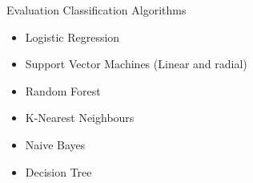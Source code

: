 \documentclass[
 size=14pt,
 paper=smartboard,  %
 mode=present, 		%
 display=slides, 	%
 style=tuliplab,  	%
 pauseslide,
 fleqn,leqno]{powerdot}
\begin{document}
\begin{slide}[toc=,bm=]{Evaluation Classification Algorithms}

\begin{center}
\begin{itemize}
\item
Logistic Regression
\item
Support Vector Machines (Linear and radial)
\item
Random Forest
\item
K-Nearest Neighbours
\item
Naive Bayes
\item
Decision Tree
\end{itemize}
\end{center}



\end{slide}
\end{document}
